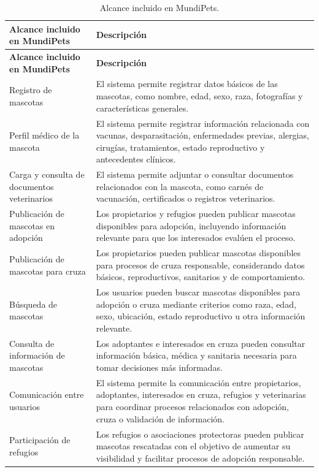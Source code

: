 \documentclass[journal,onecolumn]{IEEEtran}
\begin{document}
	\begin{longtable}{|p{4cm}|p{11cm}|}
		\caption{Alcance incluido en MundiPets.} \label{tab:alcance_incluido} \\
		\hline
		\textbf{Alcance incluido en MundiPets} & \textbf{Descripción} \\
		\hline
		\endfirsthead
		\hline
		\textbf{Alcance incluido en MundiPets} & \textbf{Descripción} \\
		\hline
		\endhead
		\hline
		\endfoot
		\hline
		\endlastfoot
		
		Registro de mascotas & El sistema permite registrar datos básicos de las mascotas, como nombre, edad, sexo, raza, fotografías y características generales. \\
		\hline
		Perfil médico de la mascota & El sistema permite registrar información relacionada con vacunas, desparasitación, enfermedades previas, alergias, cirugías, tratamientos, estado reproductivo y antecedentes clínicos. \\
		\hline
		Carga y consulta de documentos veterinarios & El sistema permite adjuntar o consultar documentos relacionados con la mascota, como carnés de vacunación, certificados o registros veterinarios. \\
		\hline
		Publicación de mascotas en adopción & Los propietarios y refugios pueden publicar mascotas disponibles para adopción, incluyendo información relevante para que los interesados evalúen el proceso. \\
		\hline
		Publicación de mascotas para cruza & Los propietarios pueden publicar mascotas disponibles para procesos de cruza responsable, considerando datos básicos, reproductivos, sanitarios y de comportamiento. \\
		\hline
		Búsqueda de mascotas & Los usuarios pueden buscar mascotas disponibles para adopción o cruza mediante criterios como raza, edad, sexo, ubicación, estado reproductivo u otra información relevante. \\
		\hline
		Consulta de información de mascotas & Los adoptantes e interesados en cruza pueden consultar información básica, médica y sanitaria necesaria para tomar decisiones más informadas. \\
		\hline
		Comunicación entre usuarios & El sistema permite la comunicación entre propietarios, adoptantes, interesados en cruza, refugios y veterinarias para coordinar procesos relacionados con adopción, cruza o validación de información. \\
		\hline
		Participación de refugios & Los refugios o asociaciones protectoras pueden publicar mascotas rescatadas con el objetivo de aumentar su visibilidad y facilitar procesos de adopción responsable. \\

\end{longtable}
\end{document}
